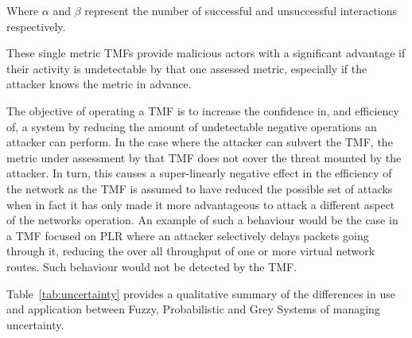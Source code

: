 Where $\alpha$ and $\beta$ represent the number of successful and unsuccessful interactions respectively.

These single metric TMFs provide malicious actors with a significant advantage if their activity is undetectable by that one assessed metric, especially if the attacker knows the metric in advance.

The objective of operating a TMF is to increase the confidence in, and efficiency of, a system by reducing the amount of undetectable negative operations an attacker can perform.
In the case where the attacker can subvert the TMF, the metric under assessment by that TMF does not cover the threat mounted by the attacker.
In turn, this causes a super-linearly negative effect in the efficiency of the network as the TMF is assumed to have reduced the possible set of attacks when in fact it has only made it more advantageous to attack a different aspect of the networks operation.
An example of such a behaviour would be the case in a TMF focused on PLR where an attacker selectively delays packets going through it, reducing the over all throughput of one or more virtual network routes.
Such behaviour would not be detected by the TMF.




Table~\ref{tab:uncertainty} provides a qualitative summary of the differences in use and application between Fuzzy, Probabilistic and Grey Systems of managing uncertainty.


